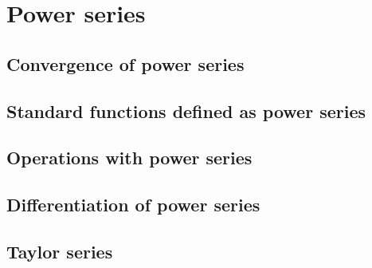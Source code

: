 \section{Power series}

\subsection{Convergence of power series}

\subsection{Standard functions defined as power series}

\subsection{Operations with power series}

\subsection{Differentiation of power series}

\subsection{Taylor series}
